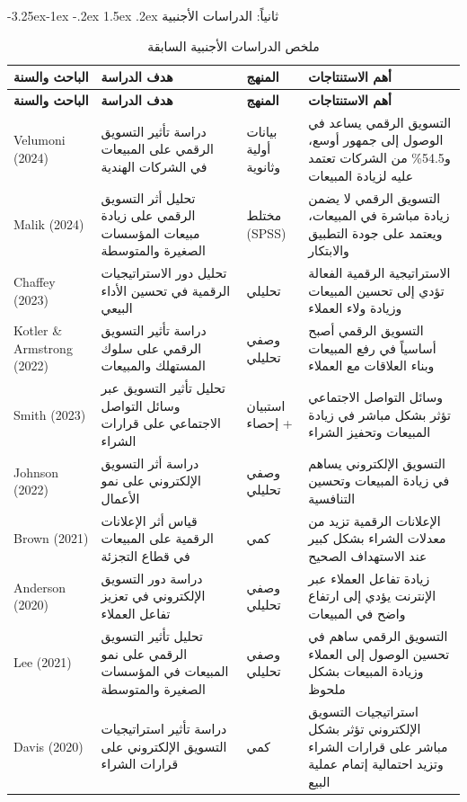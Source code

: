 \documentclass[12pt, a4paper]{report}
\makeatletter
\newcommand{\lr}[1]{\textenglish{#1}}
\renewcommand\subsection{\@startsection{subsection}{2}{\z@}%
  {-3.25ex\@plus -1ex \@minus -.2ex}%
  {1.5ex \@plus .2ex}%
  {\normalfont\large\bfseries\color{sectiongray}}}
\makeatother
\begin{document}
\subsection{ثانياً: الدراسات الأجنبية}

\begin{longtable}{|p{3.2cm}|p{4cm}|p{2.3cm}|p{4.5cm}|}
\caption{ملخص الدراسات الأجنبية السابقة}\label{tab:foreign_studies}\\
\hline
\rowcolor{tableheader}
\textbf{الباحث والسنة} & \textbf{هدف الدراسة} & \textbf{المنهج} & \textbf{أهم الاستنتاجات} \\
\hline
\endfirsthead
\hline
\rowcolor{tableheader}
\textbf{الباحث والسنة} & \textbf{هدف الدراسة} & \textbf{المنهج} & \textbf{أهم الاستنتاجات} \\
\hline
\endhead

\lr{Velumoni (2024)} & دراسة تأثير التسويق الرقمي على المبيعات في الشركات الهندية & بيانات أولية وثانوية & التسويق الرقمي يساعد في الوصول إلى جمهور أوسع، و54.5\% من الشركات تعتمد عليه لزيادة المبيعات \\
\hline
\lr{Malik (2024)} & تحليل أثر التسويق الرقمي على زيادة مبيعات المؤسسات الصغيرة والمتوسطة & مختلط \lr{(SPSS)} & التسويق الرقمي لا يضمن زيادة مباشرة في المبيعات، ويعتمد على جودة التطبيق والابتكار \\
\hline
\lr{Chaffey (2023)} & تحليل دور الاستراتيجيات الرقمية في تحسين الأداء البيعي & تحليلي & الاستراتيجية الرقمية الفعالة تؤدي إلى تحسين المبيعات وزيادة ولاء العملاء \\
\hline
\lr{Kotler \& Armstrong (2022)} & دراسة تأثير التسويق الرقمي على سلوك المستهلك والمبيعات & وصفي تحليلي & التسويق الرقمي أصبح أساسياً في رفع المبيعات وبناء العلاقات مع العملاء \\
\hline
\lr{Smith (2023)} & تحليل تأثير التسويق عبر وسائل التواصل الاجتماعي على قرارات الشراء & استبيان + إحصاء & وسائل التواصل الاجتماعي تؤثر بشكل مباشر في زيادة المبيعات وتحفيز الشراء \\
\hline
\lr{Johnson (2022)} & دراسة أثر التسويق الإلكتروني على نمو الأعمال & وصفي تحليلي & التسويق الإلكتروني يساهم في زيادة المبيعات وتحسين التنافسية \\
\hline
\lr{Brown (2021)} & قياس أثر الإعلانات الرقمية على المبيعات في قطاع التجزئة & كمي & الإعلانات الرقمية تزيد من معدلات الشراء بشكل كبير عند الاستهداف الصحيح \\
\hline
\lr{Anderson (2020)} & دراسة دور التسويق الإلكتروني في تعزيز تفاعل العملاء & وصفي تحليلي & زيادة تفاعل العملاء عبر الإنترنت يؤدي إلى ارتفاع واضح في المبيعات \\
\hline
\lr{Lee (2021)} & تحليل تأثير التسويق الرقمي على نمو المبيعات في المؤسسات الصغيرة والمتوسطة & وصفي تحليلي & التسويق الرقمي ساهم في تحسين الوصول إلى العملاء وزيادة المبيعات بشكل ملحوظ \\
\hline
\lr{Davis (2020)} & دراسة تأثير استراتيجيات التسويق الإلكتروني على قرارات الشراء & كمي & استراتيجيات التسويق الإلكتروني تؤثر بشكل مباشر على قرارات الشراء وتزيد احتمالية إتمام عملية البيع \\
\hline
\end{longtable}
\end{document}
